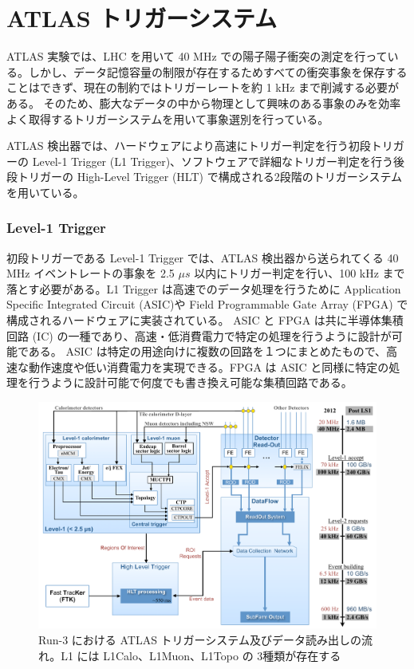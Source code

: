 \section{ATLAS トリガーシステム}
ATLAS 実験では、LHC を用いて 40 MHz での陽子陽子衝突の測定を行っている。しかし、データ記憶容量の制限が存在するためすべての衝突事象を保存することはできず、現在の制約ではトリガーレートを約 1 kHz まで削減する必要がある。
そのため、膨大なデータの中から物理として興味のある事象のみを効率よく取得するトリガーシステムを用いて事象選別を行っている。

ATLAS 検出器では、ハードウェアにより高速にトリガー判定を行う初段トリガーの Level-1 Trigger (L1 Trigger)、ソフトウェアで詳細なトリガー判定を行う後段トリガーの High-Level Trigger (HLT) で構成される2段階のトリガーシステムを用いている。

\subsubsection{Level-1 Trigger}
初段トリガーである Level-1 Trigger では、ATLAS 検出器から送られてくる 40 MHz イベントレートの事象を 2.5 $\mu s$ 以内にトリガー判定を行い、100 kHz まで落とす必要がある。L1 Trigger は高速でのデータ処理を行うために Application Specific Integrated Circuit (ASIC)や Field Programmable Gate Array (FPGA) で構成されるハードウェアに実装されている。
ASIC と FPGA は共に半導体集積回路 (IC) の一種であり、高速・低消費電力で特定の処理を行うように設計が可能である。
ASIC は特定の用途向けに複数の回路を１つにまとめたもので、高速な動作速度や低い消費電力を実現できる。FPGA は ASIC と同様に特定の処理を行うように設計可能で何度でも書き換え可能な集積回路である。

\begin{figure}[tb]
  \centering
  \includegraphics[clip, width=14cm]{fig/3/trigger-nagare2.pdf}
  \caption{Run-3 における ATLAS トリガーシステム及びデータ読み出しの流れ。L1 には L1Calo、L1Muon、L1Topo の 3種類が存在する}
  \label{fig:トリガーの全体像}
\end{figure}

